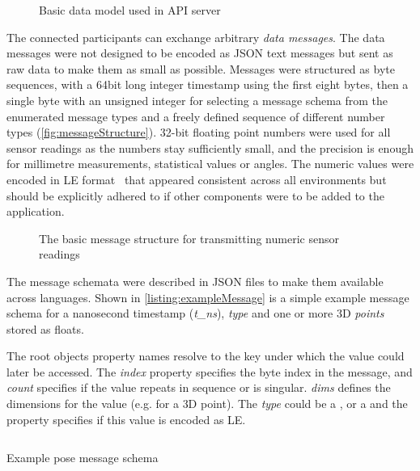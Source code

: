 \begin{figure}[!ht]
\centering

\caption[API data model]{Basic data model used in API server\protect}
\label{fig:apiDataModel}
\end{figure}

The connected participants can exchange arbitrary \emph{data messages}.
The data messages were not designed to be encoded as \ac{JSON} text messages but sent as raw data to make them as small as possible.
Messages were structured as byte sequences, with a 64bit long integer timestamp using the first eight bytes, then a single byte with an unsigned integer for selecting a message schema from the enumerated message types and a freely defined sequence of different number types (\autoref{fig:messageStructure}).
32-bit floating point numbers were used for all sensor readings as the numbers stay sufficiently small, and the precision is enough for millimetre measurements, statistical values or angles.
The numeric values were encoded in \ac{LE} format~\parencite{cohenEndianess} that appeared consistent across all environments but should be explicitly adhered to if other components were to be added to the application.

\begin{figure}[!ht]
\centering

\caption[Generic Message Structure]{The basic message structure for transmitting numeric sensor readings\protect}
\label{fig:messageStructure}
\end{figure}

The message schemata were described in \ac{JSON} files to make them available across languages.
Shown in \autoref{listing:exampleMessage} is a simple example message schema for a nanosecond timestamp (\emph{{t\_ns}}), \emph{type} and one or more \ac{3D} \emph{points} stored as floats.

The root object\textquotesingle s property names resolve to the key under which the value could later be accessed.
The \emph{index} property specifies the byte index in the message, and \emph{count} specifies if the value repeats in sequence or is singular. \emph{dims} defines the dimensions for the value (e.g.  for a \ac{3D} point).
The \emph{type} could be a ,  or a  and the property  specifies if this value is encoded as \ac{LE}.

\begin{listing}[!ht]
\inputminted{json}{04_Artefakte/03_Listings/example-pose-message.json}
\caption{Example pose message schema}
\label{listing:exampleMessage}
\end{listing}

